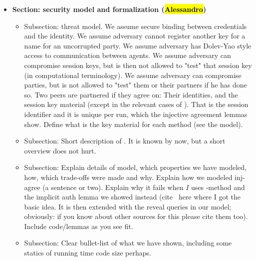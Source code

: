 \documentclass[runningheads]{llncs}
\begin{document}
{\begin{itemize}
\begin{itemize}
             \item Describe negotiation of method.
             \item Describe transmission of aux data and expected security
                 properties.
        \end{itemize}
    \item \textbf{Section: \mEdhoc security model and formalization (\hl{Alessandro})}
        \begin{itemize}
            \item Subsection: threat model. We assume secure binding between
                credentials and the identity. We assume adversary cannot
                register another key for a name for an uncorrupted party. We
                assume adversary has Dolev-Yao style access to communication
                between agents. We assume adversary can compromise session keys,
                but is then not allowed to "test" that session key (in
                computational terminology). We assume adversary can compromise
                parties, but is not allowed to "test" them or their partners if
                he has done so. Two peers are partnered if they agree on: Their
                identities, and the session key material (except \mGiy in the
                relevant cases of \mStat). That is the session identifier and it
                is unique per run, which the injective agreement lemmas show.
                Define what is the key material for each method
                (see the \mTamarin model).
            \item Subsection: Short description of \mTamarin. It is known by
                now, but a short overview does not hurt.
            \item Subsection: Explain details of model, which properties we have
                modeled, how, which trade-offs were made and why.
                Explain how we modeled inj-agree (a sentence or two). Explain
                why it fails when $I$ uses \mStat-method and the implicit auth
                lemma we showed instead
                (cite~\cite{DBLP:journals/iacr/GuilhemFW19} here where I got the
                basic idea. It is then extended with the reveal queries in our
                model; obviously: if you know about other sources for this
                please cite them too). Include code/lemmas as you see fit.
            \item Subsection: Clear bullet-list of what we have shown, including
                some statics of running time code size perhaps.

\end{itemize}
\end{itemize}}
\end{document}

